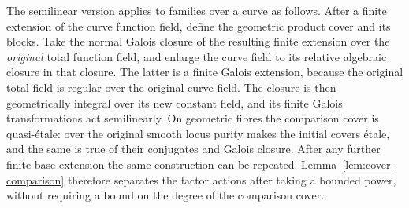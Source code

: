 The semilinear version applies to families over a curve as follows.
After a finite extension of the curve function field, define the
geometric product cover and its blocks. Take the normal Galois
closure of the resulting finite extension over the \emph{original}
total function field, and enlarge the curve field to its relative
algebraic closure in that closure. The latter is a finite Galois
extension, because the original total field is regular over the
original curve field. The closure is then geometrically integral
over its new constant field, and its finite Galois transformations
act semilinearly. On geometric fibres the comparison cover is
quasi-\'etale: over the original smooth locus purity makes the
initial covers \'etale, and the same is true of their conjugates
and Galois closure. After any further finite base extension the
same construction can be repeated. Lemma~\ref{lem:cover-comparison}
therefore separates the factor actions after taking a bounded
power, without requiring a bound on the degree of the comparison
cover.
